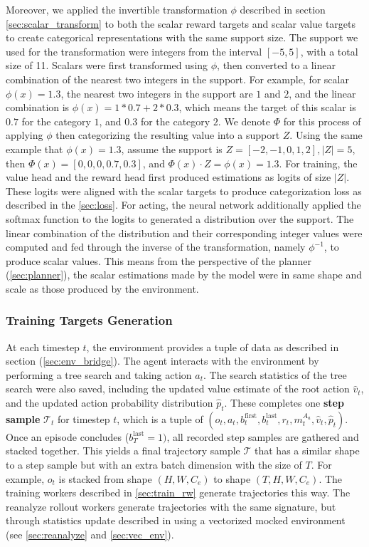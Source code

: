 Moreover, we applied the invertible transformation \( \phi \) described in section \ref{sec:scalar_transform} to both the scalar reward targets and scalar value targets to create categorical representations with the same support size.
The support we used for the transformation were integers from the interval \( [-5, 5] \), with a total size of 11.
Scalars were first transformed using \( \phi \), then converted to a linear combination of the nearest two integers in the support.
For example, for scalar \(\phi(x) = 1.3\), the nearest two integers in the support are $1$ and $2$, and the linear combination is \( \phi(x) = 1 * 0.7 + 2 * 0.3 \), which means the target of this scalar is $0.7$ for the category $1$, and $0.3$ for the category $2$.
We denote $\Phi$ for this process of applying $\phi$ then categorizing the resulting value into a support $Z$.
Using the same example that $\phi(x) = 1.3$, assume the support is $Z = [-2, -1, 0, 1, 2], |Z| = 5$,
then $\Phi(x) = [0, 0, 0, 0.7, 0.3]$, and $\Phi(x) \cdot Z = \phi(x) = 1.3$.
For training, the value head and the reward head first produced estimations as logits of size $|Z|$.
These logits were aligned with the scalar targets to produce categorization loss as described in the \ref{sec:loss}.
For acting, the neural network additionally applied the softmax function to the logits to generated a distribution over the support.
The linear combination of the distribution and their corresponding integer values were computed and fed through the inverse of the transformation, namely \( \phi^{-1}\), to produce scalar values.
This means from the perspective of the planner (\ref{sec:planner}), the scalar estimations made by the model were in same shape and scale as those produced by the environment.

\subsubsection{Training Targets Generation} \label{sec:targets}
At each timestep $t$, the environment provides a tuple of data as described in section (\ref{sec:env_bridge}).
The agent interacts with the environment by performing a tree search and taking action $a_t$.
The search statistics of the tree search were also saved, including the updated value estimate of the root action $\hat{v}_t$,
and the updated action probability distribution $\hat{p}_t$.
These completes one \textbf{step sample} $\mathcal{T}_t$ for timestep $t$, which is a tuple of $(o_t, a_t, b^{\text{first}}_{t}, b^{\text{last}}_{t}, r_t, m^{A_a}_t, \hat{v}_t, \hat{p}_t)$.
Once an episode concludes ($b^{\text{last}}_{T} = 1)$, all recorded step samples are gathered and stacked together.
This yields a final trajectory sample $\mathcal{T}$ that has a similar shape to a step sample but with an extra batch dimension with the size of $T$.
For example, $o_t$ is stacked from shape $(H, W, C_e)$ to shape $(T, H, W, C_e)$.
The training workers described in \ref{sec:train_rw} generate trajectories this way.
The reanalyze rollout workers generate trajectories with the same signature, but through statistics update described in using a vectorized mocked environment (see \ref{sec:reanalyze} and \ref{sec:vec_env}).

